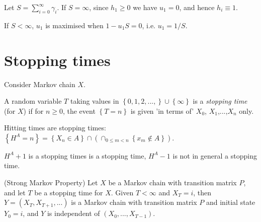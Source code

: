 \documentclass[a4paper]{article}
\begin{document}
Let $S = \sum_{i=0}^\infty \gamma_i$. If $S=\infty$, since $h_1\geq 0$ we have $u_1 = 0$, and hence $h_i \equiv 1$.

If $S < \infty$, $u_1$ is maximised when $1-u_1 S = 0$, i.e. $u_1 = 1/S$.

\newpage

\section{Stopping times}

Consider Markov chain $X$.

\begin{defi}
A random variable $T$ taking values in $\left\{0,1,2,...,\right\}\cup\left\{\infty\right\}$ is a \emph{stopping time} (for $X$) if for $n\geq 0$, the event $\left\{T=n\right\}$ is given 'in terms of' $X_0$, $X_1$,...,$X_n$ only.
\end{defi}

Hitting times are stopping times: $\left\{H^A = n\right\} = \left\{X_n \in A \right\} \cap \left(\cap_{0\leq m< n} \left\{x_m \not\in A\right\}\right)$.

$H^A+1$ is a stopping times is a stopping time, $H^A-1$ is not in general a stopping time.

\begin{defi} (Strong Markov Property) Let $X$ be a Markov chain with transition matrix $P$, and let $T$ be a stopping time for $X$. Given $T<\infty$ and $X_T = i$, then $Y=\left(X_T,X_{T+1},...\right)$ is a Markov chain with transition matrix $P$ and initial state $Y_0 = i$, and $Y$ is independent of $\left(X_0,...,X_{T-1}\right)$.
\end{defi}
\end{document}
